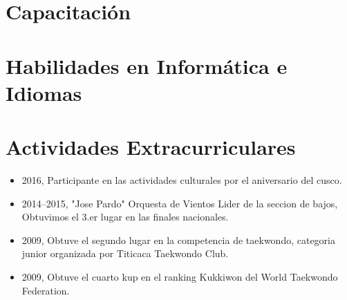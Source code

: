 \documentclass[11pt,a4paper,sans]{moderncv} %
\begin{document}
\section{Capacitaci\'on}

\section{Habilidades en Inform\'atica e Idiomas}




\section{Actividades Extracurriculares}
\begin{itemize}
\item{2016, Participante en las actividades culturales por el aniversario del cusco.}
\item{2014--2015, "Jose Pardo" Orquesta de Vientos Lider de la seccion de bajos, Obtuvimos el 3.er lugar en las finales nacionales.}
\item{2009, Obtuve el segundo lugar en la competencia de taekwondo, categoria junior organizada por Titicaca Taekwondo Club.}
\item{2009, Obtuve el cuarto kup en el ranking Kukkiwon del World Taekwondo Federation.}
\end{itemize}
\end{document}
